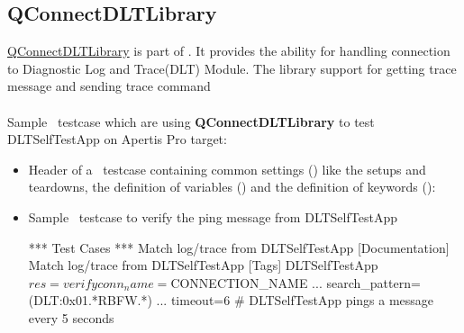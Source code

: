 \subsection{QConnectDLTLibrary}
\href{https://sourcecode.socialcoding.bosch.com/projects/ROBFW/repos/robotframework-qconnect-dlt/browse}
{QConnectDLTLibrary} is part of \rfw.
It provides the ability for handling connection to Diagnostic Log and Trace(DLT) Module.
The library support for getting trace message and sending trace command\\
\\
Sample \rfw\ testcase which are using \textbf{QConnectDLTLibrary} to
test DLTSelfTestApp on Apertis Pro target:
\begin{itemize}
   \item Header of a \rfw\ testcase containing common settings () like the setups and teardowns,
         the definition of variables ()
         and the definition of keywords ():

   \item Sample \rfw\ testcase to verify the ping message from DLTSelfTestApp
   \begin{robotcode}
*** Test Cases ***
Match log/trace from DLTSelfTestApp
   [Documentation]   Match log/trace from DLTSelfTestApp
   [Tags]   DLTSelfTestApp
   ${res}=    verify     conn_name=${CONNECTION_NAME}
   ...                   search_pattern=(DLT:0x01.*RBFW.*)
   ...                   timeout=6    # DLTSelfTestApp pings a message every 5 seconds


\end{robotcode}
\end{itemize}
